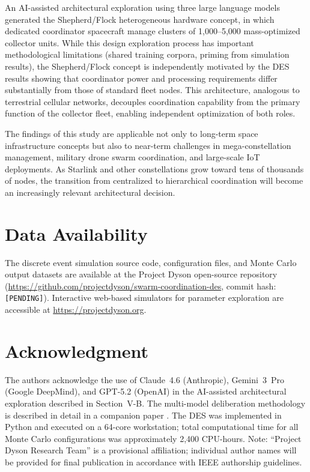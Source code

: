 \documentclass[journal]{IEEEtran}
\begin{document}
An AI-assisted architectural exploration using three large language models generated the Shepherd/Flock heterogeneous hardware concept, in which dedicated coordinator spacecraft manage clusters of 1{,}000--5{,}000 mass-optimized collector units. While this design exploration process has important methodological limitations (shared training corpora, priming from simulation results), the Shepherd/Flock concept is independently motivated by the DES results showing that coordinator power and processing requirements differ substantially from those of standard fleet nodes. This architecture, analogous to terrestrial cellular networks, decouples coordination capability from the primary function of the collector fleet, enabling independent optimization of both roles.

The findings of this study are applicable not only to long-term space infrastructure concepts but also to near-term challenges in mega-constellation management, military drone swarm coordination, and large-scale IoT deployments. As Starlink and other constellations grow toward tens of thousands of nodes, the transition from centralized to hierarchical coordination will become an increasingly relevant architectural decision.

\section*{Data Availability}

The discrete event simulation source code, configuration files, and Monte Carlo output datasets are available at the Project Dyson open-source repository (\url{https://github.com/projectdyson/swarm-coordination-des}, commit hash: \texttt{[PENDING]}). Interactive web-based simulators for parameter exploration are accessible at \url{https://projectdyson.org}.

\section*{Acknowledgment}

The authors acknowledge the use of Claude~4.6 (Anthropic), Gemini~3~Pro (Google DeepMind), and GPT-5.2 (OpenAI) in the AI-assisted architectural exploration described in Section~V-B. The multi-model deliberation methodology is described in detail in a companion paper \cite{dyson_multimodel}. The DES was implemented in Python and executed on a 64-core workstation; total computational time for all Monte Carlo configurations was approximately 2{,}400 CPU-hours. Note: ``Project Dyson Research Team'' is a provisional affiliation; individual author names will be provided for final publication in accordance with IEEE authorship guidelines.
\end{document}
